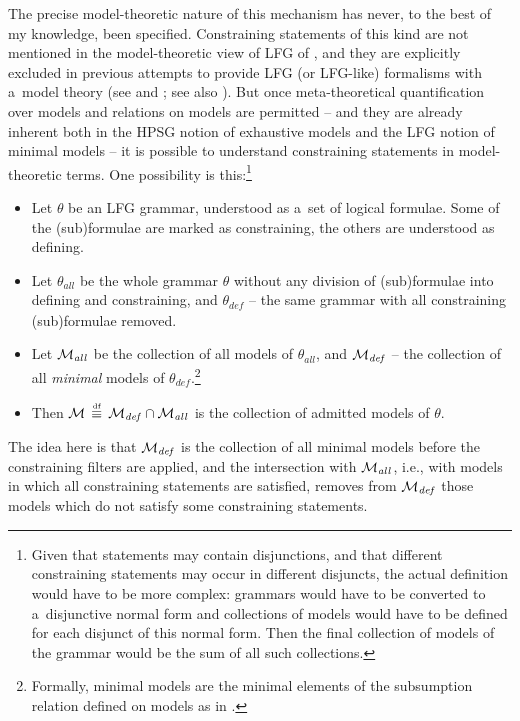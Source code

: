 \documentclass[output=paper,hidelinks]{langscibook}
\begin{document}
The precise model-theoretic nature of this mechanism has never, to the best of my knowledge, been specified.  Constraining statements of this kind are not mentioned in the model-theoretic view of LFG of \citet{kaplan1995formal}, and they are explicitly excluded in previous attempts to provide LFG (or LFG-like) formalisms with a~model theory (see \citealt[Section {4.2}]{john:88:book} and \citealt[Section {6}]{blackburn1995a-specification}; see also \citealt{BorjPayn13}).  But once meta-theoretical quantification over models and relations on models are permitted -- and they are already inherent both in the HPSG notion of exhaustive models and the LFG notion of minimal models -- it is possible to understand constraining statements in model-theoretic terms.  One possibility is this:\footnote{Given that statements may contain disjunctions, and that different constraining statements may occur in different disjuncts, the actual definition would have to be more complex: grammars would have to be converted to a~disjunctive normal form and collections of models would have to be defined for each disjunct of this normal form.  Then the final collection of models of the grammar would be the sum of all such collections.}

\begin{itemize}
\item Let $\theta$ be an LFG grammar, understood as a~set of logical formulae.  Some of the (sub)formulae are marked as constraining, the others are understood as defining.
\item Let $\theta_{\mathit{all}}$ be the whole grammar $\theta$ without any division of (sub)formulae into defining and constraining, and $\theta_{\mathit{def}}$ -- the same grammar with all constraining (sub)formulae removed. \item Let ${\cal M}_{\mathit{all}}$ be the collection of all models of $\theta_{\mathit{all}}$, and ${\cal M}_{\mathit{def}}$ -- the collection of all \emph{minimal} models of $\theta_{\mathit{def}}$.\footnote{Formally, minimal models are the minimal elements of the subsumption relation defined on models as in \citet[Section {2.8}]{john:88:book}.}
\item Then ${\cal M} \,\stackrel{\text{\tiny df}}{\equiv} \,{\cal M}_{\mathit{def}} \cap {\cal M}_{\mathit{all}}$ is the collection of admitted models of $\theta$.
\end{itemize}
The idea here is that ${\cal M}_{\mathit{def}}$ is the collection of all minimal models before the constraining filters are applied, and the intersection with ${\cal M}_{\mathit{all}}$, i.e., with models in which all constraining statements are satisfied, removes from ${\cal M}_{\mathit{def}}$ those models which do not satisfy some constraining statements.
\end{document}
